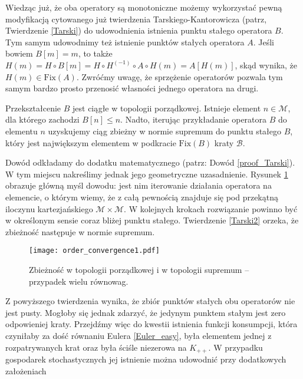 Wiedząc już, że oba operatory są monotoniczne możemy wykorzystać pewną modyfikacją cytowanego już twierdzenia Tarskiego-Kantorowicza (patrz, Twierdzenie \ref{Tarski}) do udowodnienia istnienia punktu stałego operatora $B$. Tym samym udowodnimy też istnienie punktów stałych operatora $A$. Jeśli bowiem $B[m]=m$, to także $H(m) = H \circ B[m] = H \circ H^{(-1)} \circ A \circ H (m) = A[H(m)]$, skąd wynika, że $H(m) \in \mathrm{Fix}(A)$. Zwróćmy uwagę, że sprzężenie operatorów pozwala tym samym bardzo prosto przenosić własności jednego operatora na drugi.
 

\begin{tw}\label{Tarski2}
	Przekształcenie $B$ jest ciągłe w topologii porządkowej. Istnieje element $n \in \mathcal{M}$, dla którego zachodzi $B[n] \leq n$. Nadto, iterując przykładanie operatora $B$ do elementu $n$ uzyskujemy ciąg zbieżny w normie supremum do punktu stałego $B$, który jest największym elementem w podkracie $\mathrm{Fix}(B)$ kraty $\mathcal{B}$. 	
\end{tw}

Dowód odkładamy do dodatku matematycznego (patrz: Dowód \ref{proof_Tarski}).
W tym miejscu nakreślimy jednak jego geometryczne uzasadnienie. Rysunek \ref{rys3} obrazuje główną myśl dowodu: jest nim iterowanie działania operatora na elemencie, o którym wiemy, że z całą pewnością znajduje się pod przekątną iloczynu kartezjańskiego $\mathcal{M} \times \mathcal{M}$. W kolejnych krokach rozwiązanie powinno być w określonym sensie coraz bliżej punktu stałego. Twierdzenie \ref{Tarski2} orzeka, że zbieżność następuje w normie supremum. 

\begin{figure}
	\begin{center}
		\texttt{[image: order\_convergence1.pdf]} 
		\caption[Zbieżność w topologii porządkowej i w topologii supremum -- przypadek wielu równowag]{Zbieżność w topologii porządkowej i w topologii supremum -- przypadek wielu równowag. \\ }\label{rys3}
	\end{center}
\end{figure}

Z powyższego twierdzenia wynika, że zbiór punktów stałych obu operatorów nie jest pusty. Mogłoby się jednak zdarzyć, że jedynym punktem stałym jest zero odpowieniej kraty. Przejdźmy więc do kwestii istnienia funkcji konsumpcji, która czyniłaby za dość równaniu Eulera \ref{Euler_easy}, była elementem jednej z rozpatrywanych krat oraz była ściśle niezerowa na $ K_{++}$. W przypadku gospodarek stochastycznych jej istnienie można udowodnić przy dodatkowych założeniach 

